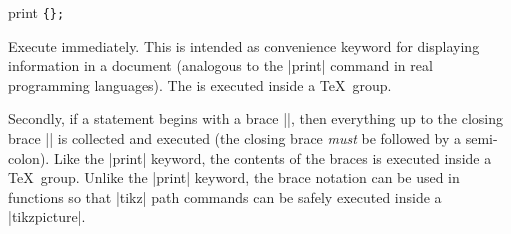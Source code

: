 \begin{math-keyword}{{print} \texttt{\{}\texttt{\};}}
  
  Execute  immediately. This is intended as convenience 
  keyword for displaying information in a document (analogous to
  the |print| command in real programming languages).
  The  is executed inside a \TeX\ group.
  
\begin{codeexample}[]
\end{codeexample}

\end{math-keyword}
  
  Secondly, if a statement begins with  a brace |{|, then 
  everything up to the closing brace |}| is collected
  and executed (the closing brace \emph{must} 
  be followed by a semi-colon).
  Like the |print| keyword, the contents of the braces 
  is executed inside a \TeX\ group.
  Unlike the |print| keyword, the brace notation can be used in
  functions so that |tikz| path commands can be safely executed 
  inside a |tikzpicture|.
  
\begin{codeexample}[]
\end{codeexample}






\endinput
